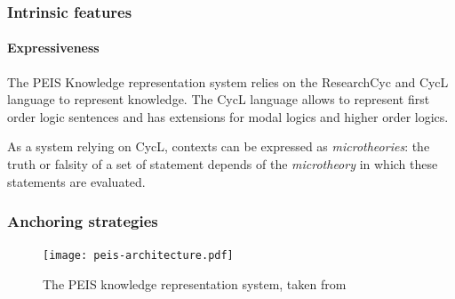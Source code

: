 \documentclass[a4paper, twocolumn]{article}
\begin{document}

\subsubsection{Intrinsic features}
\label{sect|peis-intrinsic-features}

\paragraph{Expressiveness} The PEIS Knowledge representation system relies on
the {\sc ResearchCyc} and {\sc CycL} language to represent knowledge. The {\sc CycL} language
allows to represent first order logic sentences and has extensions for modal logics and higher order logics.


As a system relying on {\sc CycL}, contexts can be expressed as
\emph{microtheories}: the truth or falsity of a set of statement depends of the
\emph{microtheory} in which these statements are evaluated.


\subsubsection{Anchoring strategies}
\label{sect|peis-anchoring}

\begin{figure}
	\centering
	\texttt{[image: peis-architecture.pdf]}
	\caption{The PEIS knowledge representation system, taken from~\cite{Daoutis2009}}
	\label{fig|peis-archi}
\end{figure}
\end{document}
